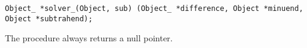 
\tt{Object_ *solver_(Object, sub)%
(Object_ *difference, Object *minuend, Object *subtrahend);}


The procedure always returns a null pointer.
